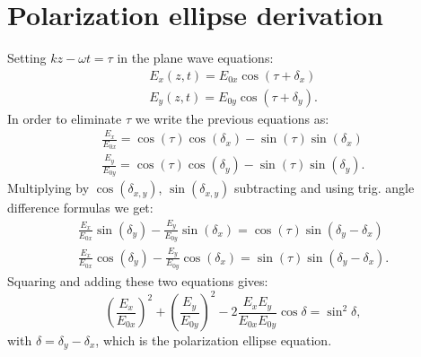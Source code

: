 \section{Polarization ellipse derivation}
\label{sec:deriv_pol_ellipse}
Setting $kz-\omega t=\tau$ in the plane wave equations:
\begin{equation}
\begin{aligned}
    E_x(z, t) = E_{0x}\cos(\tau + \delta_x) \\
    E_y(z, t) = E_{0y}\cos(\tau + \delta_y).
\end{aligned}
\end{equation}
In order to eliminate $\tau$ we write the previous equations as:
\begin{equation}
\begin{aligned}
    \frac{E_x}{E_{0x}} = \cos(\tau)\cos(\delta_x) - \sin(\tau)\sin(\delta_x)\\
    \frac{E_y}{E_{0y}} = \cos(\tau)\cos(\delta_y) - \sin(\tau)\sin(\delta_y).
\end{aligned}
\end{equation}
Multiplying by $\cos(\delta_{x,y})$, $\sin(\delta_{x,y})$ subtracting and using trig. angle difference formulas we get:
\begin{equation}
\begin{aligned}
    \frac{E_x}{E_{0x}}\sin(\delta_y) - \frac{E_y}{E_{0y}}\sin(\delta_x) = \cos(\tau)\sin(\delta_y-\delta_x)\\
    \frac{E_x}{E_{0x}}\cos(\delta_y) - \frac{E_y}{E_{0y}}\cos(\delta_x) = \sin(\tau)\sin(\delta_y-\delta_x).
\end{aligned}
\end{equation}
Squaring and adding these two equations gives:
\begin{equation}
    \left(\frac{E_x}{E_{0x}}\right)^2+\left(\frac{E_y}{E_{0y}}\right)^2-2\frac{E_x E_y}{E_{0x} E_{0y}}\cos \delta =\sin^2 \delta,
\end{equation}
with $\delta=\delta_y-\delta_x$, which is the polarization ellipse equation.


